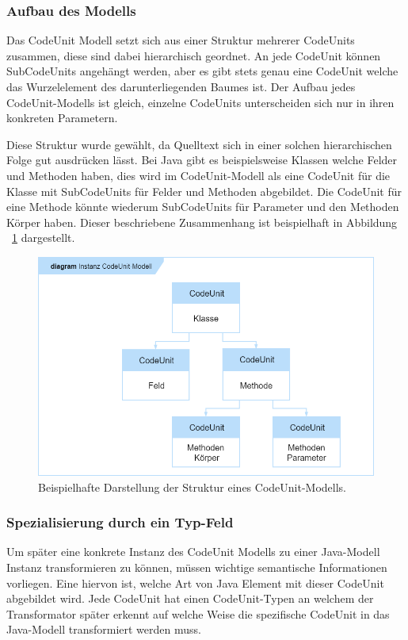\documentclass[12pt,oneside,a4paper,parskip]{scrbook}
\begin{document}
\subsubsection{Aufbau des Modells}

Das CodeUnit Modell setzt sich aus einer Struktur mehrerer CodeUnits zusammen, diese sind dabei hierarchisch geordnet. An jede CodeUnit können SubCodeUnits angehängt werden, aber es gibt stets genau eine CodeUnit welche das Wurzelelement des darunterliegenden Baumes ist. Der Aufbau jedes CodeUnit-Modells ist gleich, einzelne CodeUnits unterscheiden sich nur in ihren konkreten Parametern.

Diese Struktur wurde gewählt, da Quelltext sich in einer solchen hierarchischen Folge gut ausdrücken lässt. Bei Java gibt es beispielsweise Klassen welche Felder und Methoden haben, dies wird im CodeUnit-Modell als eine CodeUnit für die Klasse mit SubCodeUnits für Felder und Methoden abgebildet. Die CodeUnit für eine Methode könnte wiederum SubCodeUnits für Parameter und den Methoden Körper haben. Dieser beschriebene Zusammenhang ist beispielhaft in Abbildung ~\ref{fig:cu1} dargestellt.

\begin{figure}[htbp]
	\centering
	\includegraphics[width=1.0\textwidth]{bilder/cuModelBsp}
	\caption{Beispielhafte Darstellung der Struktur eines CodeUnit-Modells.}
	\label{fig:cu1}
\end{figure}

\subsubsection{Spezialisierung durch ein Typ-Feld}

Um später eine konkrete Instanz des CodeUnit Modells zu einer Java-Modell Instanz transformieren zu können, müssen wichtige semantische Informationen vorliegen. Eine hiervon ist, welche Art von Java Element mit dieser CodeUnit abgebildet wird. Jede CodeUnit hat einen CodeUnit-Typen an welchem der Transformator später erkennt auf welche Weise die spezifische CodeUnit in das Java-Modell transformiert werden muss.
\end{document}
